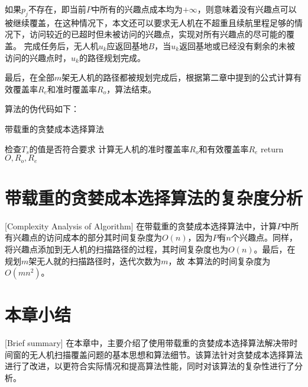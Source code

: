 如果$p_j$不存在，即当前$P$中所有的兴趣点成本均为$+\infty$，则意味着没有兴趣点可以被继续覆盖，在这种情况下，本文还可以要求无人机在不超重且续航里程足够的情况下，访问较近的已超时但未被访问的兴趣点，实现对所有兴趣点的尽可能的覆盖。
完成任务后，无人机$u_k$应返回基地$B$，当$u_k$返回基地或已经没有剩余的未被访问的兴趣点时，$u_k$的路径规划完成。


最后，在全部$m$架无人机的路径都被规划完成后，根据第二章中提到的公式计算有效覆盖率$R_e$和准时覆盖率$R_o$，算法结束。


算法的伪代码如下：
 
\begin{algorithm}[H]  %
	\caption{带载重的贪婪成本选择算法}%
	\LinesNumbered %
	检查$T_s$的值是否符合要求\; %
	计算无人机的准时覆盖率$R_o$和有效覆盖率$R_e$\;
	return $O,R_o,R_e$
\end{algorithm}


\section{带载重的贪婪成本选择算法的复杂度分析}[Complexity Analysis of Algorithm]
在带载重的贪婪成本选择算法中，计算$P$中所有兴趣点的访问成本的部分其时间复杂度为$O(n)$，因为$P$有$n$个兴趣点。同样，将兴趣点添加到无人机的扫描路径的过程，其时间复杂度也为$O(n)$。最后，在规划$m$架无人就的扫描路径时，迭代次数为$m$，故
本算法的时间复杂度为$O(mn^2)$。


\section{本章小结}[Brief summary]
在本章中，主要介绍了使用带载重的贪婪成本选择算法解决带时间窗的无人机扫描覆盖问题的基本思想和算法细节。该算法针对贪婪成本选择算法进行了改进，以更符合实际情况和提高算法性能，同时对该算法的复杂性进行了分析。